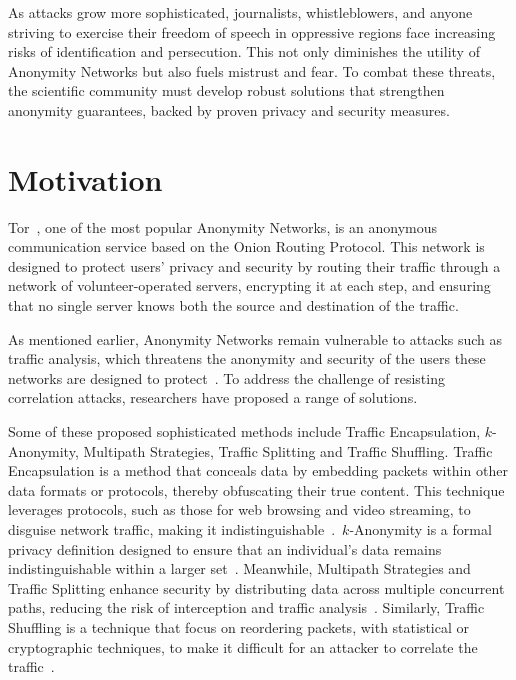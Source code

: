 As attacks grow more sophisticated, journalists, whistleblowers, and anyone striving to exercise their freedom of speech in oppressive regions face increasing risks of identification and persecution. This not only diminishes the utility of Anonymity Networks but also fuels mistrust and fear. To combat these threats, the scientific community must develop robust solutions that strengthen anonymity guarantees, backed by proven privacy and security measures.


\section{Motivation}\label{sec:motivation}

Tor~\cite{dingledine2004tor}, one of the most popular Anonymity Networks, is an anonymous communication service based on the Onion Routing Protocol. This network is designed to protect users' privacy and security by routing their traffic through a network of volunteer-operated servers, encrypting it at each step, and ensuring that no single server knows both the source and destination of the traffic.

As mentioned earlier, Anonymity Networks remain vulnerable to attacks such as traffic analysis, which threatens the anonymity and security of the users these networks are designed to protect~\cite*{chakravarty2014trafficanalysis, winter2012great, robjansen2019dosontor, StatDisclosure, PracticalStatDisclosure, DeepFingerprinting, TikTok, OnlineWebFingerprinting, TrafficAnalysisLowMixnet, AnalysisMixNetsYeZhu}. To address the challenge of resisting correlation attacks, researchers have proposed a range of solutions. 

Some of these proposed sophisticated methods include Traffic Encapsulation, \(k\)-Anonymity, Multipath Strategies, Traffic Splitting and Traffic Shuffling. Traffic Encapsulation is a method that conceals data by embedding packets within other data formats or protocols, thereby obfuscating their true content. This technique leverages protocols, such as those for web browsing and video streaming, to disguise network traffic, making it indistinguishable~\cite*{TorKameleon, MIRACE, StegoTorus, Protozoa, Stegozoa, Freewave}.~\(k\)-Anonymity is a formal privacy definition designed to ensure that an individual's data remains indistinguishable within a larger set~\cite*{DP_Book,KAnonSweeney,kAnonymityEffectiveness}. Meanwhile, Multipath Strategies and Traffic Splitting enhance security by distributing data across multiple concurrent paths, reducing the risk of interception and traffic analysis~\cite*{TorKameleon,MIRACE,Loopix,Wang_2022}. Similarly, Traffic Shuffling is a technique that focus on reordering packets, with statistical or cryptographic techniques, to make it difficult for an attacker to correlate the traffic~\cite*{DAENet, Karaoke, Riposte, Loopix, Dissent}. 

